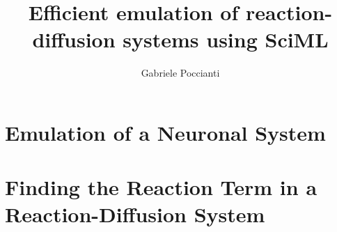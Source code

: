 \documentclass{unipd-thesis-modern} %
\title{Efficient emulation of reaction-diffusion systems using SciML}
\author{Gabriele Poccianti}
\begin{document}
   \renewcommand{\abstractpage}{}

    \frontmatter

    \mainmatter

    
    \glsresetall  %
    
    

    \part{\label{prt:First section}Emulation of a Neuronal System} %
    



    \part{\label{prt:Second section}Finding the Reaction Term in a Reaction-Diffusion System} %
    
    

    

    
    \begin{appendices}
       
%        
        
    \end{appendices}

    \backmatter
\end{document}
